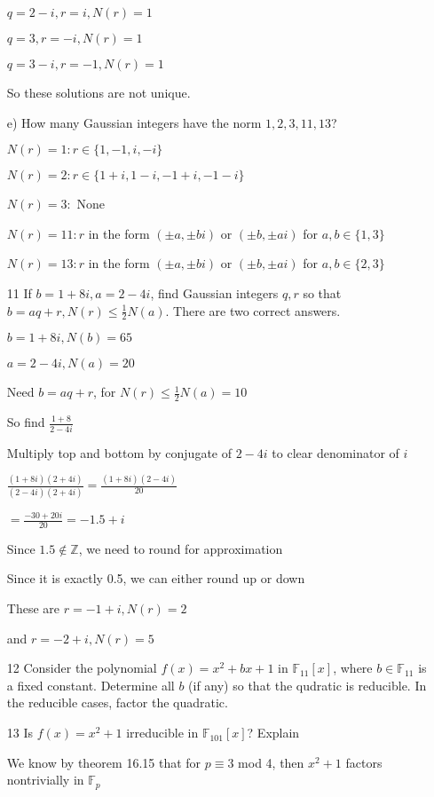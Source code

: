 \documentclass[12pt]{article}
\begin{document}
\begin{itemize}
		$q = 2 -i, r = i, N(r) = 1$
		
		$q = 3, r = -i, N(r) = 1$
		
		$q= 3- i, r = -1, N(r) = 1$
	
		So these solutions are not unique.

		e) How many Gaussian integers have the norm $1,2,3,11,13$?

		$N(r) = 1: r \in \{1, -1, i, -i\}$

		$N(r) = 2: r \in \{1+i, 1-i, -1+i, -1 - i\}$

		$N(r) = 3:$ None

		$N(r) = 11: r$ in the form $(\pm a, \pm b i)$ or $(\pm b, \pm a i)$ for $a,b \in \{1, 3\}$

		$N(r) = 13: r$ in the form $(\pm a, \pm b i)$ or $(\pm b, \pm a i)$ for $a,b \in \{2, 3\}$

	\item[11] If $b = 1 + 8i, a = 2-4i$, find Gaussian integers $q,r$ so that $b = aq + r, N(r) \leq \frac{1}{2} N(a)$. There are two correct answers.

		$b = 1 + 8i, N(b) = 65$

		$a = 2 - 4i, N(a) = 20$

		Need $b = aq + r$, for $N(r) \leq \frac{1}{2} N(a) = 10$

		So find $\frac{1+8}{2-4i}$

		Multiply top and bottom by conjugate of $2-4i$ to clear denominator of $i$

		$\frac{(1+8i)(2+4i)}{(2-4i)(2+4i)} = \frac{(1+8i)(2-4i)}{20}$

		$=\frac{-30+20i}{20} = -1.5 + i$

		Since $1.5 \not \in \mathbb{Z}$, we need to round for approximation

		Since it is exactly 0.5, we can either round up or down

		These are $r = -1 + i, N(r) = 2$

		and $r = -2 + i, N(r) = 5$

	\item[12] Consider the polynomial $f(x) = x^2 + bx + 1$ in $\mathbb{F}_{11}[x]$, where $b\in \mathbb{F}_{11}$ is a fixed constant. Determine all $b$ (if any) so that the qudratic is reducible. In the reducible cases, factor the quadratic.

	\item[13] Is $f(x) = x^2 + 1$ irreducible in $\mathbb{F}_{101}[x]$? Explain

		We know by theorem 16.15 that for $p \equiv 3$ mod 4, then $x^2 + 1$ factors nontrivially in $\mathbb{F}_p$


\end{itemize}
\end{document}

